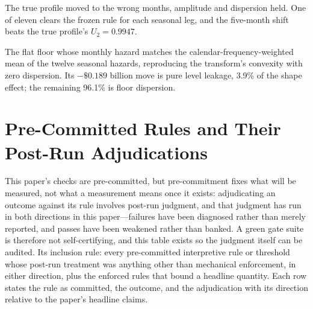 \documentclass[12pt]{article}
\begin{document}
\begin{table}[H]
\begin{threeparttable}
\begin{tablenotes}[flushleft]
\item[b] The true profile moved to the wrong months, amplitude and dispersion held. One of eleven clears the frozen rule for each seasonal leg, and the five-month shift beats the true profile's $U_2 = 0.9947$.
\item[c] The flat floor whose monthly hazard matches the calendar-frequency-weighted mean of the twelve seasonal hazards, reproducing the transform's convexity with zero dispersion. Its $-\$0.189$ billion move is pure level leakage, 3.9\% of the shape effect; the remaining 96.1\% is floor dispersion.
\end{tablenotes}
\end{threeparttable}
\end{table}

\section{Pre-Committed Rules and Their Post-Run Adjudications}\label{app:verdicts}

This paper's checks are pre-committed, but pre-commitment fixes what will be measured, not what a measurement means once it exists: adjudicating an outcome against its rule involves post-run judgment, and that judgment has run in both directions in this paper---failures have been diagnosed rather than merely reported, and passes have been weakened rather than banked. A green gate suite is therefore not self-certifying, and this table exists so the judgment itself can be audited. Its inclusion rule: every pre-committed interpretive rule or threshold whose post-run treatment was anything other than mechanical enforcement, in either direction, plus the enforced rules that bound a headline quantity. Each row states the rule as committed, the outcome, and the adjudication with its direction relative to the paper's headline claims.
\end{document}
